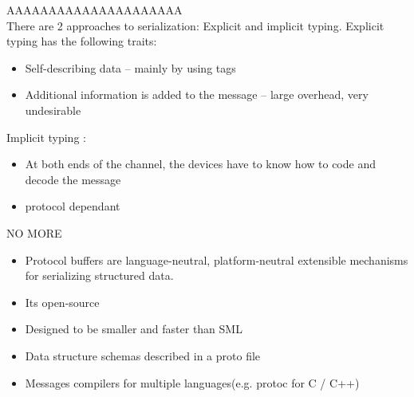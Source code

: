 {
    AAAAAAAAAAAAAAAAAAAAA
    \\
    There are 2 approaches to serialization: Explicit and implicit typing.
    Explicit typing has the following traits:
    \begin{itemize}
            \item Self-describing data -- mainly by using tags
            \item Additional information is added to the message -- large overhead, very undesirable 
    \end{itemize}
    Implicit typing :
    \begin{itemize}
            \item At both ends of the channel, the devices have to know how to code and decode the message
            \item protocol dependant
    \end{itemize}
}

{
    NO MORE\\
    \begin{itemize}
            \item Protocol buffers are language-neutral, platform-neutral extensible mechanisms for serializing structured data.
            \item Its open-source
            \item Designed to be smaller and faster than SML
            \item Data structure schemas described in a proto file
            \item Messages compilers for multiple languages(e.g. protoc for C / C++)
            
    \end{itemize}
}

